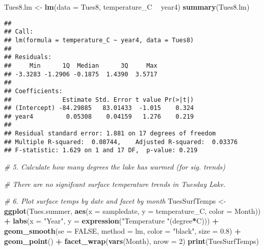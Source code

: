 \documentclass[]{article}
\newenvironment{Shaded}{\begin{snugshade}}{\end{snugshade}}
\newcommand{\CommentTok}[1]{\textcolor[rgb]{0.56,0.35,0.01}{\textit{#1}}}
\newcommand{\DataTypeTok}[1]{\textcolor[rgb]{0.13,0.29,0.53}{#1}}
\newcommand{\DecValTok}[1]{\textcolor[rgb]{0.00,0.00,0.81}{#1}}
\newcommand{\FloatTok}[1]{\textcolor[rgb]{0.00,0.00,0.81}{#1}}
\newcommand{\KeywordTok}[1]{\textcolor[rgb]{0.13,0.29,0.53}{\textbf{#1}}}
\newcommand{\NormalTok}[1]{#1}
\newcommand{\OperatorTok}[1]{\textcolor[rgb]{0.81,0.36,0.00}{\textbf{#1}}}
\newcommand{\OtherTok}[1]{\textcolor[rgb]{0.56,0.35,0.01}{#1}}
\newcommand{\StringTok}[1]{\textcolor[rgb]{0.31,0.60,0.02}{#1}}
\begin{document}
\begin{Shaded}
\begin{Highlighting}[]
\NormalTok{Tues8.lm <-}\StringTok{ }\KeywordTok{lm}\NormalTok{(}\DataTypeTok{data =}\NormalTok{ Tues8, temperature_C }\OperatorTok{~}\StringTok{ }\NormalTok{year4)}
\KeywordTok{summary}\NormalTok{(Tues8.lm)}
\end{Highlighting}
\end{Shaded}

\begin{verbatim}
## 
## Call:
## lm(formula = temperature_C ~ year4, data = Tues8)
## 
## Residuals:
##     Min      1Q  Median      3Q     Max 
## -3.3283 -1.2906 -0.1875  1.4390  3.5717 
## 
## Coefficients:
##              Estimate Std. Error t value Pr(>|t|)
## (Intercept) -84.29885   83.01433  -1.015    0.324
## year4         0.05308    0.04159   1.276    0.219
## 
## Residual standard error: 1.881 on 17 degrees of freedom
## Multiple R-squared:  0.08744,    Adjusted R-squared:  0.03376 
## F-statistic: 1.629 on 1 and 17 DF,  p-value: 0.219
\end{verbatim}

\begin{Shaded}
\begin{Highlighting}[]
\CommentTok{# 5. Calculate how many degrees the lake has warmed (for sig. trends)}

\CommentTok{# There are no signifcant surface temperature trends in Tuesday Lake.}

\CommentTok{# 6. Plot surface temps by date and facet by month}
\NormalTok{TuesSurfTemps <-}
\StringTok{  }\KeywordTok{ggplot}\NormalTok{(Tues.summer, }\KeywordTok{aes}\NormalTok{(}\DataTypeTok{x =}\NormalTok{ sampledate, }\DataTypeTok{y =}\NormalTok{ temperature_C,}
            \DataTypeTok{color =}\NormalTok{ Month)) }\OperatorTok{+}
\StringTok{  }\KeywordTok{labs}\NormalTok{(}\DataTypeTok{x =} \StringTok{"Year"}\NormalTok{, }\DataTypeTok{y =} \KeywordTok{expression}\NormalTok{(}\StringTok{"Temperature "}\NormalTok{(degree}\OperatorTok{*}\NormalTok{C))) }\OperatorTok{+}
\StringTok{  }\KeywordTok{geom_smooth}\NormalTok{(}\DataTypeTok{se =} \OtherTok{FALSE}\NormalTok{, }\DataTypeTok{method =}\NormalTok{ lm, }\DataTypeTok{color =} \StringTok{"black"}\NormalTok{, }\DataTypeTok{size =} \FloatTok{0.8}\NormalTok{) }\OperatorTok{+}
\StringTok{  }\KeywordTok{geom_point}\NormalTok{() }\OperatorTok{+}
\StringTok{  }\KeywordTok{facet_wrap}\NormalTok{(}\KeywordTok{vars}\NormalTok{(Month), }\DataTypeTok{nrow =} \DecValTok{2}\NormalTok{)}
\KeywordTok{print}\NormalTok{(TuesSurfTemps)}
\end{Highlighting}
\end{Shaded}
\end{document}
